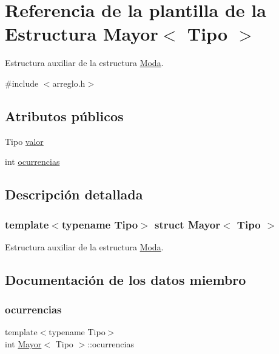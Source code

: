 \hypertarget{struct_mayor}{}\section{Referencia de la plantilla de la Estructura Mayor$<$ Tipo $>$}
\label{struct_mayor}


Estructura auxiliar de la estructura \hyperlink{struct_moda}{Moda}.  




{\ttfamily \#include $<$arreglo.\+h$>$}

\subsection*{Atributos públicos}
\begin{DoxyCompactItemize}
\item 
Tipo \hyperlink{struct_mayor_a7a5ca10e707addde5120f3b911ad2a61}{valor}
\item 
int \hyperlink{struct_mayor_a03ebe0187d8f1afc8a38ae9343b17e7b}{ocurrencias}
\end{DoxyCompactItemize}


\subsection{Descripción detallada}
\subsubsection*{template$<$typename Tipo$>$\newline
struct Mayor$<$ Tipo $>$}

Estructura auxiliar de la estructura \hyperlink{struct_moda}{Moda}. 

\subsection{Documentación de los datos miembro}
\mbox{\label{struct_mayor_a03ebe0187d8f1afc8a38ae9343b17e7b}} 
\subsubsection{\texorpdfstring{ocurrencias}{ocurrencias}}
{\footnotesize\ttfamily template$<$typename Tipo$>$ \\
int \hyperlink{struct_mayor}{Mayor}$<$ Tipo $>$\+::ocurrencias}

